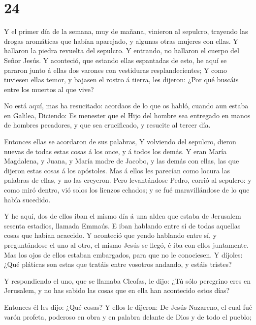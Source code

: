 \hypertarget{section-23}{%
\section{24}\label{section-23}}

 Y el primer día de la semana, muy de mañana, vinieron al
sepulcro, trayendo las drogas aromáticas que habían aparejado, y algunas
otras mujeres con ellas.  Y hallaron la piedra revuelta del
sepulcro.  Y entrando, no hallaron el cuerpo del Señor
Jesús.  Y aconteció, que estando ellas espantadas de esto,
he aquí se pararon junto á ellas dos varones con vestiduras
resplandecientes;  Y como tuviesen ellas temor, y bajasen el
rostro á tierra, les dijeron: ¿Por qué buscáis entre los muertos al que
vive?

 No está aquí, mas ha resucitado: acordaos de lo que os
habló, cuando aun estaba en Galilea,  Diciendo: Es menester
que el Hijo del hombre sea entregado en manos de hombres pecadores, y
que sea crucificado, y resucite al tercer día.

 Entonces ellas se acordaron de sus palabras,  Y
volviendo del sepulcro, dieron nuevas de todas estas cosas á los once, y
á todos los demás.  Y eran María Magdalena, y Juana, y
María madre de Jacobo, y las demás con ellas, las que dijeron estas
cosas á los apóstoles.  Mas á ellos les parecían como
locura las palabras de ellas, y no las creyeron.  Pero
levantándose Pedro, corrió al sepulcro: y como miró dentro, vió solos
los lienzos echados; y se fué maravillándose de lo que había sucedido.

 Y he aquí, dos de ellos iban el mismo día á una aldea que
estaba de Jerusalem sesenta estadios, llamada Emmaús.  E
iban hablando entre sí de todas aquellas cosas que habían acaecido.
 Y aconteció que yendo hablando entre sí, y preguntándose
el uno al otro, el mismo Jesús se llegó, é iba con ellos juntamente.
 Mas los ojos de ellos estaban embargados, para que no le
conociesen.  Y díjoles: ¿Qué pláticas son estas que tratáis
entre vosotros andando, y estáis tristes?

 Y respondiendo el uno, que se llamaba Cleofas, le dijo:
¿Tú sólo peregrino eres en Jerusalem, y no has sabido las cosas que en
ella han acontecido estos días?

 Entonces él les dijo: ¿Qué cosas? Y ellos le dijeron: De
Jesús Nazareno, el cual fué varón profeta, poderoso en obra y en palabra
delante de Dios y de todo el pueblo;

